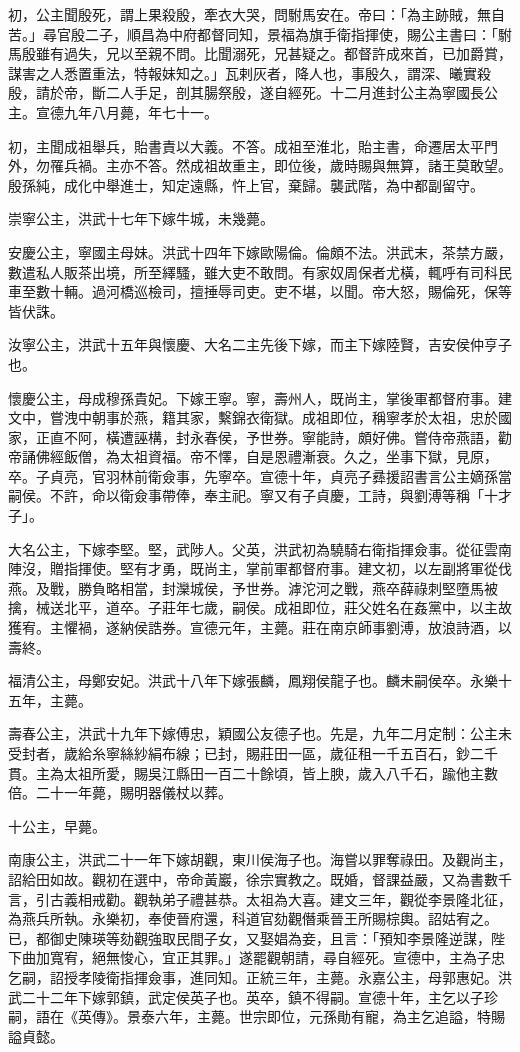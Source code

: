 初，公主聞殷死，謂上果殺殷，牽衣大哭，問駙馬安在。帝曰：「為主跡賊，無自苦。」尋官殷二子，順昌為中府都督同知，景福為旗手衛指揮使，賜公主書曰：「駙馬殷雖有過失，兄以至親不問。比聞溺死，兄甚疑之。都督許成來首，已加爵賞，謀害之人悉置重法，特報妹知之。」瓦剌灰者，降人也，事殷久，謂深、曦實殺殷，請於帝，斷二人手足，剖其腸祭殷，遂自經死。十二月進封公主為寧國長公主。宣德九年八月薨，年七十一。

初，主聞成祖舉兵，貽書責以大義。不答。成祖至淮北，貽主書，命遷居太平門外，勿罹兵禍。主亦不答。然成祖故重主，即位後，歲時賜與無算，諸王莫敢望。殷孫純，成化中舉進士，知定遠縣，忤上官，棄歸。襲武階，為中都副留守。

崇寧公主，洪武十七年下嫁牛城，未幾薨。

安慶公主，寧國主母妹。洪武十四年下嫁歐陽倫。倫頗不法。洪武末，茶禁方嚴，數遣私人販茶出境，所至繹騷，雖大吏不敢問。有家奴周保者尤橫，輒呼有司科民車至數十輛。過河橋巡檢司，擅捶辱司吏。吏不堪，以聞。帝大怒，賜倫死，保等皆伏誅。

汝寧公主，洪武十五年與懷慶、大名二主先後下嫁，而主下嫁陸賢，吉安侯仲亨子也。

懷慶公主，母成穆孫貴妃。下嫁王寧。寧，壽州人，既尚主，掌後軍都督府事。建文中，嘗洩中朝事於燕，籍其家，繫錦衣衛獄。成祖即位，稱寧孝於太祖，忠於國家，正直不阿，橫遭誣構，封永春侯，予世券。寧能詩，頗好佛。嘗侍帝燕語，勸帝誦佛經飯僧，為太祖資福。帝不懌，自是恩禮漸衰。久之，坐事下獄，見原，卒。子貞亮，官羽林前衛僉事，先寧卒。宣德十年，貞亮子彞援詔書言公主嫡孫當嗣侯。不許，命以衛僉事帶俸，奉主祀。寧又有子貞慶，工詩，與劉溥等稱「十才子」。

大名公主，下嫁李堅。堅，武陟人。父英，洪武初為驍騎右衛指揮僉事。從征雲南陣沒，贈指揮使。堅有才勇，既尚主，掌前軍都督府事。建文初，以左副將軍從伐燕。及戰，勝負略相當，封灤城侯，予世券。滹沱河之戰，燕卒薛祿刺堅墮馬被擒，械送北平，道卒。子莊年七歲，嗣侯。成祖即位，莊父姓名在姦黨中，以主故獲宥。主懼禍，遂納侯誥券。宣德元年，主薨。莊在南京師事劉溥，放浪詩酒，以壽終。

福清公主，母鄭安妃。洪武十八年下嫁張麟，鳳翔侯龍子也。麟未嗣侯卒。永樂十五年，主薨。

壽春公主，洪武十九年下嫁傅忠，穎國公友德子也。先是，九年二月定制：公主未受封者，歲給糸寧絲紗絹布線；已封，賜莊田一區，歲征租一千五百石，鈔二千貫。主為太祖所愛，賜吳江縣田一百二十餘頃，皆上腴，歲入八千石，踰他主數倍。二十一年薨，賜明器儀杖以葬。

十公主，早薨。

南康公主，洪武二十一年下嫁胡觀，東川侯海子也。海嘗以罪奪祿田。及觀尚主，詔給田如故。觀初在選中，帝命黃巖，徐宗實教之。既婚，督課益嚴，又為書數千言，引古義相戒勸。觀執弟子禮甚恭。太祖為大喜。建文三年，觀從李景隆北征，為燕兵所執。永樂初，奉使晉府還，科道官劾觀僭乘晉王所賜棕輿。詔姑宥之。已，都御史陳瑛等劾觀強取民間子女，又娶娼為妾，且言：「預知李景隆逆謀，陛下曲加寬宥，絕無悛心，宜正其罪。」遂罷觀朝請，尋自經死。宣德中，主為子忠乞嗣，詔授孝陵衛指揮僉事，進同知。正統三年，主薨。永嘉公主，母郭惠妃。洪武二十二年下嫁郭鎮，武定侯英子也。英卒，鎮不得嗣。宣德十年，主乞以子珍嗣，語在《英傳》。景泰六年，主薨。世宗即位，元孫勛有寵，為主乞追謚，特賜謚貞懿。

